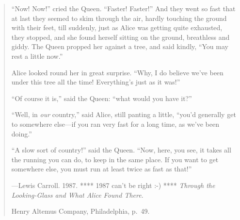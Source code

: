 

\cleardoublepage{}

\thispagestyle{empty} %

\vspace*{50 mm}

\small{}

\begin{quote}
	\protrudeleft``Now! Now!'' cried the Queen. 
	``Faster! Faster!'' 
	And they went so fast that at last they seemed to skim through the air, 
	hardly touching the ground with their feet, 
	till suddenly, 
	just as Alice was getting quite exhausted, 
	they stopped, 
	and she found herself sitting on the ground, 
	breathless and giddy. 
	The Queen propped her against a tree, and said kindly, 
	``You may rest a little now.''

	Alice looked round her in great surprise. 
	``Why, I do believe we've been under this tree all the time! 
	Everything's just as it was!''

	``Of course it is,'' said the Queen: ``what would you have it?'' %

	``Well, in \emph{our} country,'' said Alice, still panting a little, %
	``you'd generally get to somewhere else---if you ran very fast for a long time, 
	as we've been doing.''

	``A slow sort of country!'' said the Queen. 
	``Now, here, you see, it takes all the running you can do, to keep in the same place. 
	If you want to get somewhere else, you must run at least twice as fast as that!''

	\vspace{3 mm} %
	
	{
		\setlength{\parskip}{0.0pt} %
		\hfill---Lewis Carroll. 1987. **** 1987 can't be right :-) ****
				 \emph{Through the Looking-Glass and What Alice Found There}.
	
		\hfill Henry Altemus Company, Philadelphia, p.~49.
	}
\end{quote}

\normalsize{}



